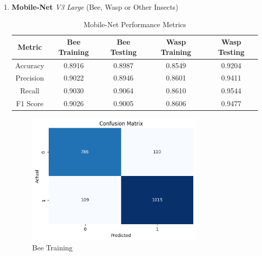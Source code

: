 \documentclass[12pt]{article}
\begin{document}
\begin{enumerate}
		\item \textbf{Mobile-Net} \textit{V3 Large}  (Bee, Wasp or Other Insects) \\
		\begin{table}[H]
			\centering
			\caption{Mobile-Net Performance Metrics}
			\vspace{0.25 cm}
			\begin{tabular}{|c|c|c|c|c|}
				\hline
				\textbf{Metric} & \textbf{Bee Training} & \textbf{Bee Testing}  & \textbf{Wasp Training} & \textbf{Wasp Testing}\\
				\hline
				Accuracy & 0.8916  & 0.8987 & 0.8549  & 0.9204\\ \hline
				Precision & 0.9022 & 0.8946 & 0.8601 & 0.9411\\ \hline
				Recall & 0.9030 & 0.9064 & 0.8610 & 0.9544 \\ \hline
				F1 Score & 0.9026  & 0.9005 & 0.8606  & 0.9477 \\ \hline
			\end{tabular}
			\label{tab:MOBILE_METRICS}
		\end{table}
		\begin{figure}[H]
			\vspace{0.5 cm}
			\centering
			\begin{minipage}{0.45\textwidth}
				\centering
				\includegraphics[width=0.8\textwidth]{Images/Confusion/mobile bees train.png} \\ \vspace{0.25 cm}
				Bee Training
			\end{minipage}
			\hfill
			\begin{minipage}{0.45\textwidth}    
				\centering

\end{minipage}
\end{figure}
\end{enumerate}
\end{document}
